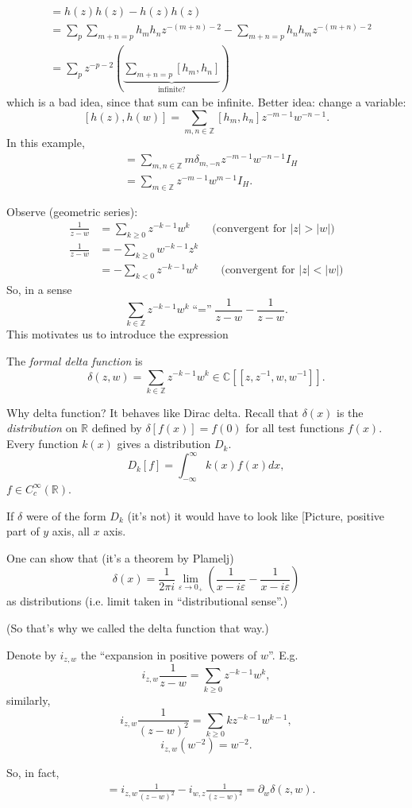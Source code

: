 \begin{align*}
[h(z),h(z)]&=h(z)h(z)-h(z)h(z)\\
&=\sum_{p}\sum_{m+n=p}h_mh_nz^{-(m+n)-2}
-\sum_{m+n=p}h_nh_mz^{-(m+n)-2}\\
&=\sum_p z^{-p-2}\left(\underbrace{\sum_{m+n=p}[h_m,h_n]}_{\text{infinite?}}
\right)
\end{align*}
which is a bad idea, since that sum can be infinite.
Better idea: change a variable:
$$
[h(z),h(w)]=\sum_{m,n \in \mathbb{Z}}[h_m,h_n]z^{-m-1}w^{-n-1}.
$$
In this example,
\begin{align*}
[h(z),h(w)]&=\sum_{m,n \in \mathbb{Z}}m \delta_{m,-n}z^{-m-1}
w^{-n-1}I_H\\
&=\sum_{m \in \mathbb{Z}}z^{-m-1}w^{m-1}I_H.
\end{align*}

Observe (geometric series):
\begin{align*}
\frac{1}{z-w}&=\sum_{k \geq 0}z^{-k-1}w^k\qquad 
\text{(convergent for $|z|>|w|$)}\\
\frac{1}{z-w}&=-\sum_{k \geq 0}w^{-k-1}z^k\\
&=-\sum_{k<0}z^{-k-1}w^k\qquad \text{(convergent for $|z|<|w|$)}
\end{align*}
So, in a sense
$$
\sum_{k \in \mathbb{Z}}z^{-k-1}w^k\text{``$=$''}\frac{1}{z-w}
-\frac{1}{z-w}.
$$
This motivates us to introduce the expression
\begin{definition}
\label{definition-delta-function}
The {\it formal delta function} is
$$
\delta(z,w)=\sum_{k \in \mathbb{Z}}z^{-k-1}w^k \in 
\mathbb{C}[\![z,z^{-1},w,w^{-1}]\!].
$$
\end{definition}
Why delta function? It behaves like Dirac delta.
Recall that $\delta(x)$ is the 
{\it distribution} on $\mathbb{R}$ defined by
$\delta[f(x)]=f(0)$ for all test functions $f(x)$.
Every function $k(x)$ gives a distribution $D_k$.
$$
D_k[f]=\int_{-\infty}^\infty k(x)f(x)dx,
$$
$f \in C_c^\infty(\mathbb{R})$.

If $\delta$ were of the form $D_k$ (it's not)
it would have to look like 
[Picture, positive part of $y$ axis, all $x$ axis.

One can show that (it's a theorem by Plamelj)
$$
\delta(x)=\frac{1}{2\pi i}\lim_{\varepsilon \to 0_+} 
\left(\frac{1}{x-i \varepsilon}-\frac{1}{x-i \varepsilon}\right)
$$
as distributions (i.e. limit taken in ``distributional sense''.)

(So that's why we called the delta function that way.)

Denote by $i_{z,w}$ the ``expansion in positive powers of $w$''.
E.g. 
$$
i_{z,w}\frac{1}{z-w}=\sum_{k\geq 0}z^{-k-1}w^k,
$$
similarly,
$$
i_{z,w}\frac{1}{(z-w)^2}=\sum_{k \geq 0}kz^{-k-1}w^{k-1},
$$
$$
i_{z,w}(w^{-2})=w^{-2}.
$$
\begin{exercise}
\label{exercise-derivative-wrt-w}
So, in fact,
\begin{align*}
[h(z),h(w)]&=i_{z,w}\frac{1}{(z-w)^2}-i_{w,z}\frac{1}{(z-w)^2}
=\partial_w \delta(z,w).
\end{align*}
\end{exercise}

